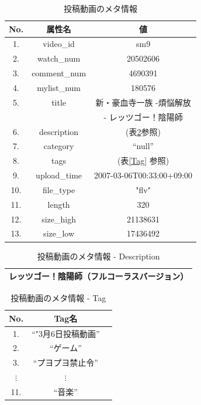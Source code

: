 \documentclass[submit,techrep,noauthor]{ipsj}
\begin{document}
\begin{table}[htb]
  \caption{投稿動画のメタ情報} 
  \label{tab:niconico_category_items}
  \begin{center}
  \begin{tabular}{|c||c|c|} \hline
No. & 属性名 & 値 \\ \hline
1. & video\_id & sm9 \\ \hline
2. & watch\_num & 20502606 \\ \hline
3. & comment\_num & 4690391 \\ \hline
4. & mylist\_num & 180576 \\ \hline
5. & title & 新・豪血寺一族 -煩悩解放 \\ 
 &  &  - レッツゴー！陰陽師 \\ \hline
6. & description & (表\ref{tab:niconico_category_description}参照) \\ \hline
7. & category & ``null'' \\ \hline
8. & tags & (表\ref{Tag} 参照) \\ \hline
9. & upload\_time & 2007-03-06T00:33:00+09:00 \\ \hline
10. & file\_type & "flv" \\ \hline
11. & length & 320 \\ \hline
12. & size\_high & 21138631 \\ \hline
13. & size\_low & 17436492 \\ \hline
  \end{tabular}
  \end{center}
  \vspace{-1.5zh}
\end{table}
%
\vspace{-0.5zh}
\begin{table}[htb]
  \caption{投稿動画のメタ情報 - Description} 
  \label{tab:niconico_category_description}
  \begin{center}
  \begin{tabular}{|l|} \hline
レッツゴー！陰陽師（フルコーラスバージョン）\\ \hline
  \end{tabular}
  \end{center}
  \vspace{-1.5zh}
\end{table}
\vspace{-0.5zh}
\begin{table}[htb]
  \caption{投稿動画のメタ情報 - Tag} 
  \label{tab:niconico_category_tag}
  \begin{center}
  \begin{tabular}{|c||c|c|} \hline
No. & Tag名\\ \hline
1. & ``"3月6日投稿動画'' \\ \hline
2. & ``ゲーム'' \\ \hline
3. & ``プヨプヨ禁止令'' \\ \hline
$\vdots$ & $\vdots$ \\ \hline
11. & ``音楽'' \\ \hline
  \end{tabular}
  \end{center}
\end{table}
\end{document}

